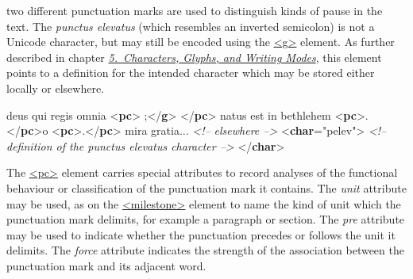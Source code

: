  two different punctuation marks are used to distinguish kinds of pause in the text. The \textit{punctus elevatus} (which resembles an inverted semicolon) is not a Unicode character, but may still be encoded using the \hyperref[TEI.g]{<g>} element. As further described in chapter \textit{\hyperref[WD]{5.\ Characters, Glyphs, and Writing Modes}}, this element points to a definition for the intended character which may be stored either locally or elsewhere. \par\bgroup{}\exampleFont \begin{shaded}\noindent\mbox{}deus qui regis omnia\mbox{}\newline 
{<\textbf{pc}>}\mbox{}\newline 
{};{</\textbf{g}>}\mbox{}\newline 
{</\textbf{pc}>} natus est in bethlehem\mbox{}\newline 
{<\textbf{pc}>}.{</\textbf{pc}>}o {<\textbf{pc}>}.{</\textbf{pc}>} mira gratia...\mbox{}\newline 
\mbox{}\newline 
\textit{<!-- elsewhere -->}\mbox{}\newline 
{<\textbf{char}\hspace*{1em}{xml:id}="{pelev}">}\mbox{}\newline 
\textit{<!-- definition of the punctus elevatus character -->}\mbox{}\newline 
{</\textbf{char}>}\end{shaded}\egroup\par \par
The \hyperref[TEI.pc]{<pc>} element carries special attributes to record analyses of the functional behaviour or classification of the punctuation mark it contains. The {\itshape unit} attribute may be used, as on the \hyperref[TEI.milestone]{<milestone>} element to name the kind of unit which the punctuation mark delimits, for example a paragraph or section. The {\itshape pre} attribute may be used to indicate whether the punctuation precedes or follows the unit it delimits. The {\itshape force} attribute indicates the strength of the association between the punctuation mark and its adjacent word.\par
